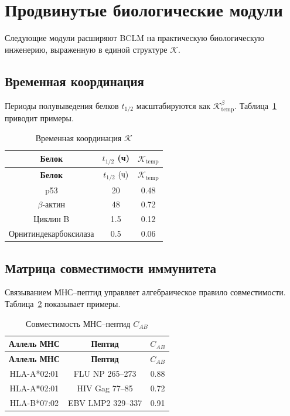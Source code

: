 \documentclass[12pt,a4paper]{article}
\newcommand{\REL}{\mathcal{K}}          %
\begin{document}
	\section{Продвинутые биологические модули}
	\label{sec:modules}
	Следующие модули расширяют BCLM на практическую биологическую инженерию, выраженную в единой структуре \(\REL\).
	
	\subsection{Временная координация}
	Периоды полувыведения белков \(t_{1/2}\) масштабируются как \(\REL_{\mathrm{temp}}^{\beta}\). Таблица~\ref{tab:temporal} приводит примеры.
	
	\begin{longtable}{|c|c|c|}
		\caption{Временная координация \(\REL\)}\label{tab:temporal}\\
		\hline
		\textbf{Белок} & \(t_{1/2}\) (ч) & \(\REL_{\mathrm{temp}}\) \\
		\hline
		\endfirsthead
		\hline
		\textbf{Белок} & \(t_{1/2}\) (ч) & \(\REL_{\mathrm{temp}}\) \\
		\hline
		\endhead
		\hline
		p53 & 20 & 0.48 \\
		\(\beta\)-актин & 48 & 0.72 \\
		Циклин B & 1.5 & 0.12 \\
		Орнитиндекарбоксилаза & 0.5 & 0.06 \\
		\hline
	\end{longtable}
	
	\subsection{Матрица совместимости иммунитета}
	Связыванием МНС–пептид управляет алгебраическое правило совместимости. Таблица~\ref{tab:mhc} показывает примеры.
	
	\begin{longtable}{|c|c|c|}
		\caption{Совместимость МНС–пептид \(C_{AB}\)}\label{tab:mhc}\\
		\hline
		\textbf{Аллель МНС} & \textbf{Пептид} & \(C_{AB}\) \\
		\hline
		\endfirsthead
		\hline
		\textbf{Аллель МНС} & \textbf{Пептид} & \(C_{AB}\) \\
		\hline
		\endhead
		\hline
		HLA-A*02:01 & FLU NP 265–273 & 0.88 \\
		HLA-A*02:01 & HIV Gag 77–85 & 0.72 \\
		HLA-B*07:02 & EBV LMP2 329–337 & 0.91 \\
		\hline
	\end{longtable}
	
\end{document}
